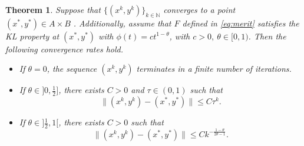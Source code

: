 \documentclass[pdflatex,sn-mathphys-num]{sn-jnl}
\numberwithin{equation}{section}%
\def\N{\mathbb{N}}
\theoremstyle{thmstyleone}%
\newtheorem{theorem}{Theorem}[section]%
\theoremstyle{thmstyletwo}%
\theoremstyle{thmstylethree}%
\begin{document}
\begin{theorem}\label{thm:iRAPM_rate}
    Suppose that $\{(x^k,y^k)\}_{k\in\N}$ converges to a point $(x^*,y^*)\in A\times B$ . Additionally, assume that $F$ defined in \eqref{eq:merit} satisfies the KL property at $(x^*,y^*)$ with $\phi(t)=ct^{1-\theta}$, with $c>0, \ \theta\in [0,1)$. Then the following convergence rates hold.
    \begin{itemize}
        \item[(i)] If $\theta=0$, the sequence $(x^k,y^k)$ terminates in a finite number of iterations.
        \item[(ii)]If $\theta\in]0,\frac{1}{2}]$, there exists $C>0 $ and $\tau\in (0,1)$ such that
        \begin{equation}\label{eq:linear}
        \|(x^k,y^k)-(x^*,y^*)\|\leq C \tau^k.
        \end{equation}
        \item[(iii)] If $\theta\in]\frac{1}{2},1[$, there exists $C>0$ such that
        \begin{equation}\label{eq:sublinear}
        \|(x^k,y^k)-(x^*,y^*)\|\leq Ck^{-\frac{1-\theta}{2\theta-1}}.
        \end{equation}
    \end{itemize}
\end{theorem}
\end{document}

